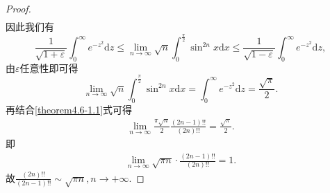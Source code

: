 \documentclass[../../main.tex]{subfiles}
\begin{document}
\begin{proof}
\begin{align*}
\end{align*}
因此我们有
\[
\frac{1}{\sqrt{1 + \varepsilon}}\int_{0}^{\infty}e^{-z^{2}}\mathrm{d}z\leqslant\lim_{n\rightarrow\infty}\sqrt{n}\int_{0}^{\frac{\pi}{2}}\sin^{2n}x \mathrm{d}x\leqslant\frac{1}{\sqrt{1 - \varepsilon}}\int_{0}^{\infty}e^{-z^{2}}\mathrm{d}z,
\]
由\(\varepsilon\)任意性即可得
\[
\lim_{n\rightarrow\infty}\sqrt{n}\int_{0}^{\frac{\pi}{2}}\sin^{2n}x \mathrm{d}x=\int_{0}^{\infty}e^{-z^{2}}\mathrm{d}z=\frac{\sqrt{\pi}}{2}.
\]
再结合\eqref{theorem4.6-1.1}式可得
\begin{align*}
\lim_{n\rightarrow \infty} \frac{\pi \sqrt{n}}{2}\frac{(2n-1)!!}{(2n)!!}=\frac{\sqrt{\pi}}{2}.
\end{align*}
即
\begin{align*}
\lim_{n\rightarrow \infty} \sqrt{\pi n}\cdot \frac{(2n-1)!!}{(2n)!!}=1.
\end{align*}
故$\frac{(2n)!!}{(2n-1)!!}\sim \sqrt{\pi n},n\rightarrow +\infty $.
\end{proof}
\end{document}
